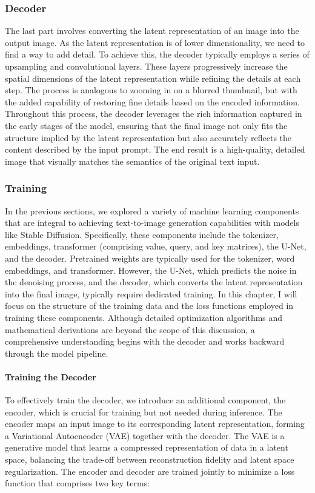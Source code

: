 \documentclass[11pt]{article}
\begin{document}
\subsubsection{Decoder}
The last part involves converting the latent representation of an image into the output image. As the latent representation is of lower dimensionality, we need to find a way to add detail. To achieve this, the decoder typically employs a series of upsampling and convolutional layers. These layers progressively increase the spatial dimensions of the latent representation while refining the details at each step. The process is analogous to zooming in on a blurred thumbnail, but with the added capability of restoring fine details based on the encoded information.
Throughout this process, the decoder leverages the rich information captured in the early stages of the model, ensuring that the final image not only fits the structure implied by the latent representation but also accurately reflects the content described by the input prompt. The end result is a high-quality, detailed image that visually matches the semantics of the original text input.


\subsubsection{Training}
\label{sec:stabel_diffusion:training}
In the previous sections, we explored a variety of machine learning components that are integral to achieving text-to-image generation capabilities with models like Stable Diffusion. Specifically, these components include the tokenizer, embeddings, transformer (comprising value, query, and key matrices), the U-Net, and the decoder. Pretrained weights are typically used for the tokenizer, word embeddings, and transformer. However, the U-Net, which predicts the noise in the denoising process, and the decoder, which converts the latent representation into the final image, typically require dedicated training. In this chapter, I will focus on the structure of the training data and the loss functions employed in training these components. Although detailed optimization algorithms and mathematical derivations are beyond the scope of this discussion, a comprehensive understanding begins with the decoder and works backward through the model pipeline.

\paragraph{Training the Decoder}
To effectively train the decoder, we introduce an additional component, the encoder, which is crucial for training but not needed during inference. The encoder maps an input image to its corresponding latent representation, forming a Variational Autoencoder (VAE)\cite{kingma2022autoencodingvariationalbayes} together with the decoder. The VAE is a generative model that learns a compressed representation of data in a latent space, balancing the trade-off between reconstruction fidelity and latent space regularization. The encoder and decoder are trained jointly to minimize a loss function that comprises two key terms:
\end{document}
